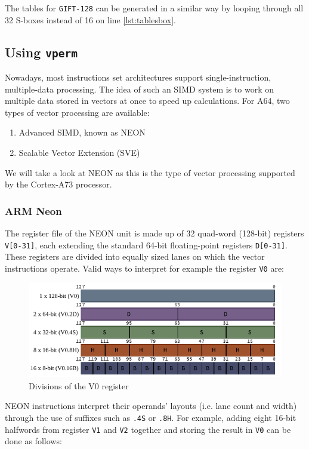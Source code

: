 \documentclass[12pt]{report}
\begin{document}
The tables for \texttt{GIFT-128} can be generated in a similar way by looping
through all 32 S-boxes instead of 16 on line \ref{lst:tablesbox}.

\subsection{Using \texttt{vperm}}

Nowadays, most instructions set architectures support single-instruction,
multiple-data processing. The idea of such an SIMD system is to work on
multiple data stored in vectors at once to speed up calculations. For A64, two
types of vector processing are available:

\begin{enumerate}
    \item Advanced SIMD, known as NEON
    \item Scalable Vector Extension (SVE)
\end{enumerate}

We will take a look at NEON as this is the type of vector processing supported
by the Cortex-A73 processor.

\subsubsection{ARM Neon}

The register file of the NEON unit is made up of 32 quad-word (128-bit)
registers \texttt{V[0-31]}, each extending the standard 64-bit floating-point
registers \mbox{\texttt{D[0-31]}}. These registers are divided into equally
sized lanes on which the vector instructions operate. Valid ways to interpret
for example the register \texttt{V0} are:

\begin{figure}[h!]
    \centering
    \includegraphics[width=\textwidth]{Figures/V_register.pdf}
    \caption{Divisions of the V0 register}
\end{figure}

NEON instructions interpret their operands' layouts (i.e. lane count and width)
through the use of suffixes such as \texttt{.4S} or \texttt{.8H}. For example,
adding eight 16-bit halfwords from register \texttt{V1} and \texttt{V2}
together and storing the result in \texttt{V0} can be done as follows:
\end{document}
